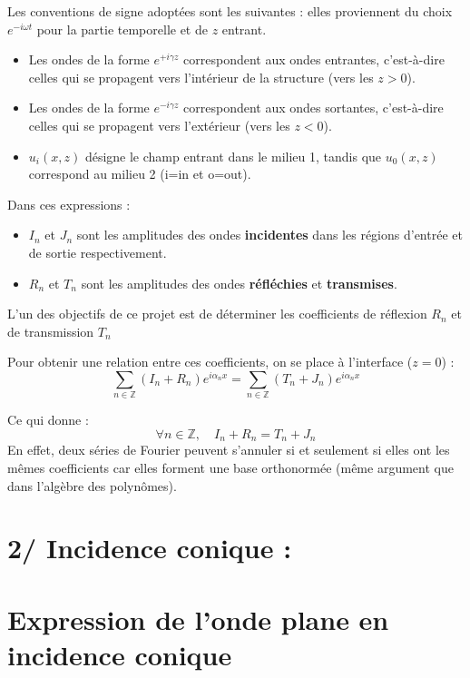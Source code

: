 \documentclass{article}
\begin{document}
Les conventions de signe adoptées sont les suivantes : elles proviennent du choix \(e^{-i\omega t}
\) pour la partie temporelle et de \(z\) entrant.
\begin{itemize}
  \item Les ondes de la forme \( e^{+i \gamma z} \) correspondent aux ondes entrantes, c’est-à-dire celles qui se propagent vers l’intérieur de la structure (vers les \(z>0\)).
  \item Les ondes de la forme \( e^{-i \gamma z} \) correspondent aux ondes sortantes, c’est-à-dire celles qui se propagent vers l’extérieur (vers les \(z<0\)).
  \item \( u_i(x,z) \) désigne le champ entrant dans le milieu 1, tandis que \( u_0(x,z) \) correspond au milieu 2 (i=in et o=out).
\end{itemize}

\medskip



Dans ces expressions :
\begin{itemize}
  \item \( I_n \) et \( J_n \) sont les amplitudes des ondes \textbf{incidentes} dans les régions d'entrée et de sortie respectivement.
  \item \( R_n \) et \( T_n \) sont les amplitudes des ondes \textbf{réfléchies} et \textbf{transmises}.
\end{itemize}

\medskip

L’un des objectifs de ce projet est de déterminer les coefficients de réflexion \( R_n \) et de transmission \( T_n \)

Pour obtenir une relation entre ces coefficients, on se place à l'interface ($z = 0$) :
\[
\sum_{n \in \mathbb{Z}} \left( I_n + R_n \right) e^{i \alpha_n x}
=
\sum_{n \in \mathbb{Z}} \left( T_n + J_n \right) e^{i \alpha_n x}
\]

Ce qui donne :
\[
\forall n \in \mathbb{Z}, \quad I_n + R_n = T_n + J_n
\]
En effet, deux séries de Fourier peuvent s'annuler si et seulement si elles ont les mêmes coefficients car elles forment une base orthonormée (même argument que dans l'algèbre des polynômes).
\section*{2/ Incidence conique :}
\section*{Expression de l’onde plane en incidence conique}
\end{document}

